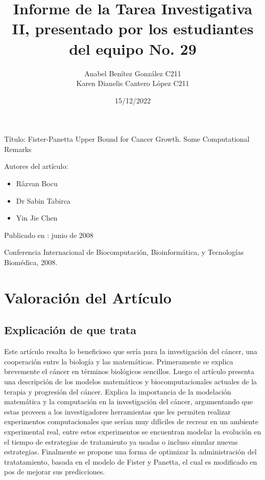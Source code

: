 \documentclass[a4 paper, 12pt]{article}
\begin{document}
\title{Informe de la Tarea Investigativa II, presentado por los estudiantes del equipo No. 29}
\author{Anabel Ben\'itez Gonz\'alez C211 \\[10pt] Karen Dianelis Cantero L\'opez C211}

\date{15/12/2022}
\maketitle

\begin{center}
\large{T\'itulo: Fister-Panetta Upper Bound for Cancer Growth. Some 
Computational Remarks \\[10pt]}
\end{center}

Autores del art\'iculo:
\begin{itemize}
\item R\^{a}zvan Bocu
\item Dr Sabin Tabirca
\item Yin Jie Chen
\end{itemize}

\begin{center}
Publicado en : junio de 2008
\end{center}
\begin{center}
Conferencia Internacional de Biocomputaci\'on, Bioinform\'atica, y Tecnolog\'ias Biom\'edica, 2008.
\end{center}
 
\section{Valoraci\'on del Art\'iculo}
\subsection{Explicaci\'on de que trata}
Este art\'iculo resalta lo beneficioso que ser\'ia para la investigaci\'on del c\'ancer, una \mbox{cooperaci\'on} entre la biolog\'ia y las matem\'aticas. Primeramente se explica brevemente el c\'ancer en t\'erminos biol\'ogicos 
sencillos. Luego el art\'iculo presenta una descripci\'on de los modelos matem\'aticos y biocomputacionales actuales de la terapia y progresi\'on del c\'ancer. Explica la importancia de la modelaci\'on matem\'atica y 
la computaci\'on en la investigaci\'on del c\'ancer, argumentando que estas proveen a los investigadores herramientas que les permiten realizar experimentos computacionales que ser\'ian muy dif\'iciles de recrear en un ambiente 
experimental real, \mbox{entre} estos experimentos se encuentran modelar la evoluci\'on en el tiempo de estrategias de tratamiento ya usadas o incluso simular nuevas estrategias. Finalmente se propone una forma de optimizar la
administraci\'on del tratatamiento, basada en el modelo de Fister y Panetta, el cual es modificado en pos de mejorar sus predicciones.\\[10pt]
\end{document}
